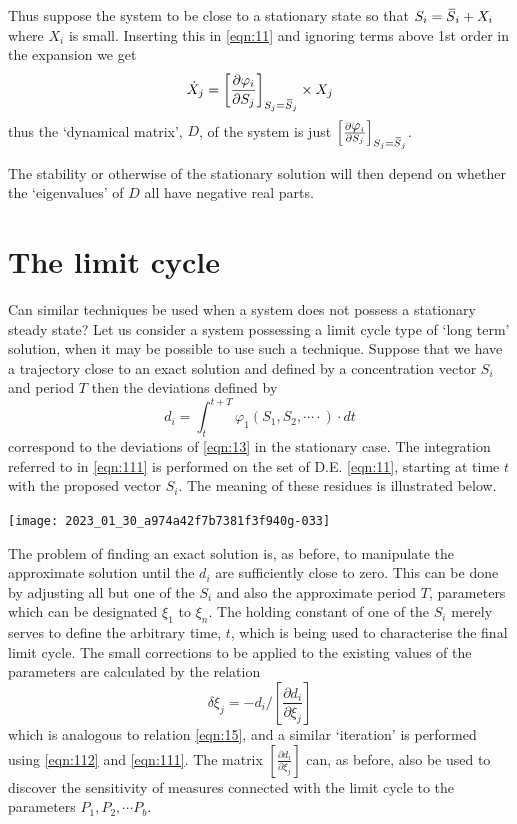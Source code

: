 Thus suppose the system to be close to a stationary state so that $S_{i}=\,\overline{\!{S}}_{i} + X_{i}$ where $X_{i}$ is small. Inserting this in \eqref{eqn:11} and ignoring terms above 1st order in the expansion we get
%
\begin{equation}
\dot{X}_{j} = \left[\frac{\partial \varphi_{i}}{\partial S_{j}}\right]_{S_{j}=\olsi{S}_{j}} \times X_{j}
\label{eqn:110}
\end{equation}
%
thus the `dynamical matrix', $D$, of the system is just $\left[\frac{\partial \varphi_{i}}{\partial S_{j}}\right]_{S_{j}=\olsi{S}_{j}}$.

The stability or otherwise of the stationary solution will then depend on whether the `eigenvalues' of $D$ all have negative real parts.

\section{The limit cycle}

Can similar techniques be used when a system does not possess a stationary steady state? Let us consider a system possessing a limit cycle type of `long term' solution, when it may be possible to use such a technique. Suppose that we have a trajectory close to an exact solution and defined by a concentration vector $S_{i}$ and period $T$ then the deviations defined by
%
\begin{equation}
d_{i}=\int_{t}^{t+T} \varphi_{1}\left(S_{1}, S_{2}, \cdots \cdot\right) \cdot dt
\label{eqn:111}
\end{equation}
%
correspond to the deviations of \eqref{eqn:13} in the stationary case. The integration referred to in  \eqref{eqn:111} is performed on the set of D.E. \eqref{eqn:11}, starting at time $t$ with the proposed vector $S_{i}$. The meaning of these residues is illustrated below.

\begin{center}
\texttt{[image: 2023\_01\_30\_a974a42f7b7381f3f940g-033]}
\end{center}

The problem of finding an exact solution is, as before, to manipulate the approximate solution until the $d_{i}$ are sufficiently close to zero. This can be done by adjusting all but one of the $S_{i}$ and also the approximate period $T$, parameters which can be designated $\xi_1$ to $\xi_n$. The holding constant of one of the $S_{i}$ merely serves to define the arbitrary time, $t$, which is being used to characterise the final limit cycle. The small corrections to be applied to the existing values of the parameters are calculated by the relation
%
\begin{equation}
\delta \xi_{j} = -d_{i} \bigg/\left[\frac{\partial d_{i}}{\partial \xi_{j}}\right]
\label{eqn:112}
\end{equation}
%
which is analogous to relation \eqref{eqn:15}, and a similar `iteration' is performed using \eqref{eqn:112} and  \eqref{eqn:111}. The matrix $\left[\frac{\partial d_{i}}{\partial \xi_{j}}\right]$ can, as before, also be used to discover the sensitivity of measures connected with the limit cycle to the parameters $P_1, P_2, \cdots P_b$.

